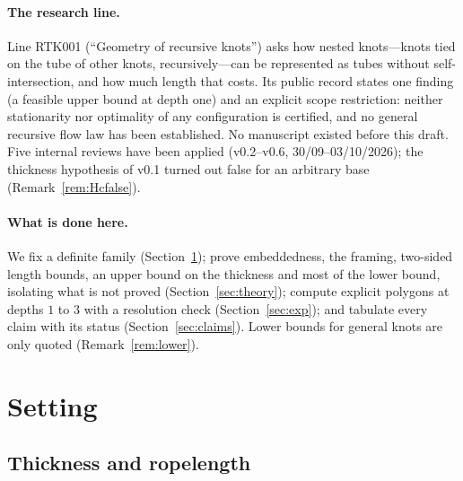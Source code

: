 \documentclass[10pt,a4paper]{article}
\theoremstyle{plain}
\theoremstyle{definition}
\theoremstyle{remark}
\begin{document}
\paragraph{The research line.} Line RTK001 (``Geometry of recursive knots'') asks how nested knots---knots tied on the tube of other knots, recursively---can be represented as tubes without self-intersection, and how much length that costs. Its public record states one finding (a feasible upper bound at depth one) and an explicit scope restriction: neither stationarity nor optimality of any configuration is certified, and no general recursive flow law has been established. No manuscript existed before this draft. Five internal reviews have been applied (v0.2--v0.6, 30/09--03/10/2026); the thickness hypothesis of v0.1 turned out false for an arbitrary base (Remark~\ref{rem:Hcfalse}).

\paragraph{What is done here.} We fix a definite family (Section~\ref{sec:setting}); prove embeddedness, the framing, two-sided length bounds, an upper bound on the thickness and most of the lower bound, isolating what is not proved (Section~\ref{sec:theory}); compute explicit polygons at depths $1$ to $3$ with a resolution check (Section~\ref{sec:exp}); and tabulate every claim with its status (Section~\ref{sec:claims}). Lower bounds for general knots are only quoted (Remark~\ref{rem:lower}).

\section{Setting}\label{sec:setting}

\subsection{Thickness and ropelength}
\end{document}
